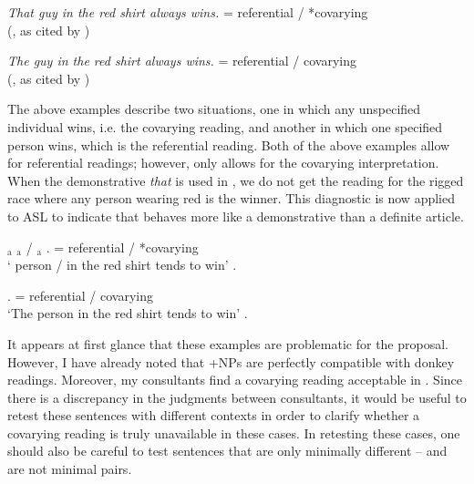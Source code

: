 \documentclass[output=paper,
modfonts
]{langscibook}
\begin{document}
\begin{exe}
	\ex \label{ex:irani:84} \textit{That guy in the red shirt always wins.} = referential / *covarying \\ (\citealt{Nowak2013}, as cited by \citealt[229]{KoulidobrovaLilloMartin2016}) 
	
	\ex \label{ex:irani:85} \textit{The guy in the red shirt always wins.} = referential / covarying \\ (\citealt{Nowak2013}, as cited by \citealt[229]{KoulidobrovaLilloMartin2016}) 
\end{exe}

The above examples describe two situations, one in which any unspecified individual wins, i.e. the covarying reading, and another in which one specified person wins, which is the referential reading. Both of the above examples allow for referential readings; however, only  allows for the covarying interpretation. When the demonstrative \textit{that} is used in , we do not get the reading for the rigged race where any person wearing red is the winner. This diagnostic is now applied to ASL to indicate that  behaves more like a demonstrative than a definite article. 

\begin{exe}
	\ex \label{ex:irani:86} {$_\text{a}$ $_\text{a}$ / $_\text{a}$} . = referential / *covarying\\ 
	` person /  in the red shirt tends to win' \citep[237]{KoulidobrovaLilloMartin2016}.
	
	\ex \label{ex:irani:87} . = referential / covarying \\
	`The person in the red shirt tends to win’ \citep[237]{KoulidobrovaLilloMartin2016}.
\end{exe}

It appears at first glance that these examples are problematic for the proposal. However, I have already noted that +NPs are perfectly compatible with donkey readings. Moreover, my consultants find a covarying reading acceptable in . Since there is a discrepancy in the judgments between consultants, it would be useful to retest these sentences with different contexts in order to clarify whether a covarying reading is truly unavailable in these cases. In retesting these cases, one should also be careful to test sentences that are only minimally different --  and  are not minimal pairs. 
\end{document}
